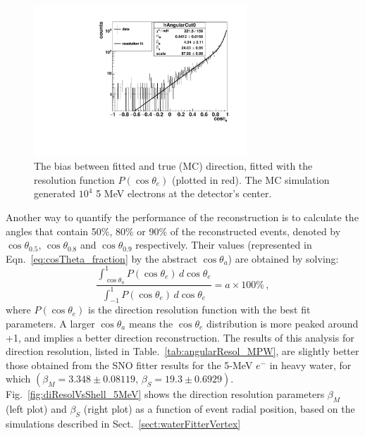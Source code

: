 \begin{figure}[htbp]\label{fig:directionResol_5MeV}
	\centering
	\includegraphics[width=8cm]{MPW_waterDirection_5MeV.pdf}
	\caption[The bias between the fitted and true (MC) direction.]{The bias between fitted and true (MC) direction, fitted with the resolution function $P(\cos\theta_e)$ (plotted in red). The MC simulation generated $10^4$ 5 MeV electrons at the detector's center.}%
\end{figure}

Another way to quantify the performance of the reconstruction is to calculate the angles that contain 50\%, 80\%
or 90\% of the reconstructed events, denoted by $\cos\theta_{0.5}$, $\cos\theta_{0.8}$ and $\cos\theta_{0.9}$ respectively\cite{coulter2013modelling}. Their values (represented in Eqn.~\ref{eq:cosTheta_fraction} by the abstract $\cos\theta_{a}$) are obtained by solving:
\begin{equation}\label{eq:cosTheta_fraction}
\frac{\int_{\cos\theta_{a}}^1 P(\cos\theta_e) \, d\cos\theta_e}{\int_{-1}^1 P(\cos\theta_e) \, d\cos\theta_e} = a\times 100\% \, ,
\end{equation}
where $P(\cos\theta_e)$ is the direction resolution function with the best fit parameters. A larger $\cos\theta_{a}$ means the $\cos\theta_e$ distribution is more peaked around +1, and implies a better direction reconstruction. The results of this analysis for direction resolution, listed in Table.~\ref{tab:angularResol_MPW}, are slightly better those obtained from the SNO fitter results for the 5-MeV $e^-$ in heavy water, for which \cite{boulay2004direct} $(\beta_M=3.348\pm 0.08119, \, \beta_S=19.3\pm 0.6929)$. Fig.~\ref{fig:diResolVsShell_5MeV} shows the direction resolution parameters $\beta_M$ (left plot) and $\beta_S$ (right plot) as a function of event radial position, based on the simulations described in Sect.~\ref{sect:waterFitterVertex}


